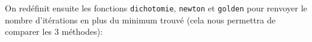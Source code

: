 {\begin{td-sol}
\begin{enumerate}
            \vspace{5pt}
            \begin{minipage}{0.48\textwidth}
                \centering
            \end{minipage}
            \begin{minipage}{0.48\textwidth}
                \centering
            \end{minipage}
            \vspace{5pt}

            On redéfinit ensuite les fonctions \texttt{dichotomie}, \texttt{newton} et \texttt{golden}
            pour renvoyer le nombre d'itérations en plus du minimum trouvé (cela nous permettra de comparer
            les 3 méthodes):
            

\end{enumerate}
\end{td-sol}}
